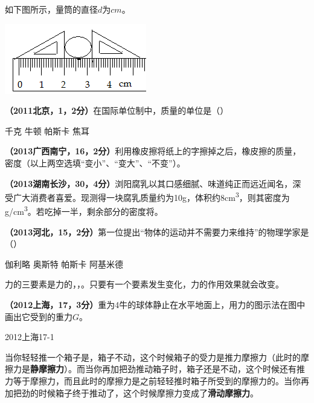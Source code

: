 \documentclass[12pt,twoside]{exam}
\begin{document}
\begin{knowledge}
\begin{questions}
\question
如下图所示，量筒的直径$d$为\answerline*[1.20]$cm$。

\includegraphics[scale=1]{figures/图片12.png} 

\question
\textbf{（2011北京，1，2分）}在国际单位制中，质量的单位是（\answerline*[A]）

\begin{oneparchoices}
\choice 千克
\choice 牛顿
\choice 帕斯卡
\choice 焦耳
\end{oneparchoices}

\question
\textbf{（2013广西南宁，16，2分）}利用橡皮擦将纸上的字擦掉之后，橡皮擦的质量\answerline*[变小]，密度\answerline*[不变]（以上两空选填“变小”、“变大”、“不变”）。

\question
\textbf{（2013湖南长沙，30，4分）}浏阳腐乳以其口感细腻、味道纯正而远近闻名，深受广大消费者喜爱。现测得一块腐乳质量约为10g，体积约8\si{cm^3}，则其密度为\answerline*[1.25]\si{g/cm^3}。若吃掉一半，剩余部分的密度将\answerline*[不变]。

\question
\textbf{（2013河北，15，2分）}第一位提出“物体的运动并不需要力来维持”的物理学家是（\answerline*[A]）

\begin{oneparchoices}
\choice 伽利略
\choice 奥斯特
\choice 帕斯卡
\choice 阿基米德
\end{oneparchoices}


\question
力的三要素是力的\answerline*[大小]，\answerline*[方向]，\answerline*[作用点]。只要有一个要素发生变化，力的作用效果就会改变。

\question
\textbf{（2012上海，17，3分）}重为4牛的球体静止在水平地面上，用力的图示法在图中画出它受到的重力$G$。
\begin{linefig}[0.5]{2012上海17-1}
\end{linefig}



\question
当你轻轻推一个箱子是，箱子不动，这个时候箱子的受力是推力\answerline*[等于]摩擦力（此时的摩擦力是\textbf{静摩擦力}）。而当你再加把劲推动箱子时，箱子还是不动，这个时候还有推力等于摩擦力，而且此时的摩擦力是\answerline*[大于]之前轻轻推时箱子所受到的摩擦力的。当你再加把劲的时候箱子终于推动了，这个时候摩擦力变成了\textbf{滑动摩擦力}。


\end{questions}
\end{knowledge}
\end{document}
